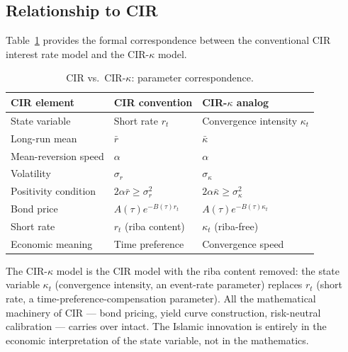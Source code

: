 \documentclass[10pt,twocolumn]{article}
\theoremstyle{plain}
\theoremstyle{definition}
\begin{document}
\subsection{Relationship to CIR}

Table~\ref{tab:cir_comparison} provides the formal correspondence
between the conventional CIR interest rate model and the
CIR-$\kappa$ model.

\begin{table}[h!]
\centering
\caption{CIR vs.\ CIR-$\kappa$: parameter correspondence.}
\label{tab:cir_comparison}
\small
\begin{tabular}{@{}lll@{}}
\toprule
\textbf{CIR element} & \textbf{CIR convention} & \textbf{CIR-$\kappa$ analog} \\
\midrule
State variable & Short rate $r_t$ & Convergence intensity $\kappa_t$ \\
Long-run mean & $\bar r$ & $\bar\kappa$ \\
Mean-reversion speed & $\alpha$ & $\alpha$ \\
Volatility & $\sigma_r$ & $\sigma_\kappa$ \\
Positivity condition & $2\alpha\bar r \geq \sigma_r^2$ & $2\alpha\bar\kappa \geq \sigma_\kappa^2$ \\
Bond price & $A(\tau)e^{-B(\tau)r_t}$ & $A(\tau)e^{-B(\tau)\kappa_t}$ \\
Short rate & $r_t$ (riba content) & $\kappa_t$ (riba-free) \\
Economic meaning & Time preference & Convergence speed \\
\bottomrule
\end{tabular}
\end{table}

The CIR-$\kappa$ model is the CIR model with the riba
content removed: the state variable $\kappa_t$ (convergence
intensity, an event-rate parameter) replaces $r_t$ (short
rate, a time-preference-compensation parameter). All the
mathematical machinery of CIR --- bond pricing, yield curve
construction, risk-neutral calibration --- carries over intact.
The Islamic innovation is entirely in the economic interpretation
of the state variable, not in the mathematics.
\end{document}
